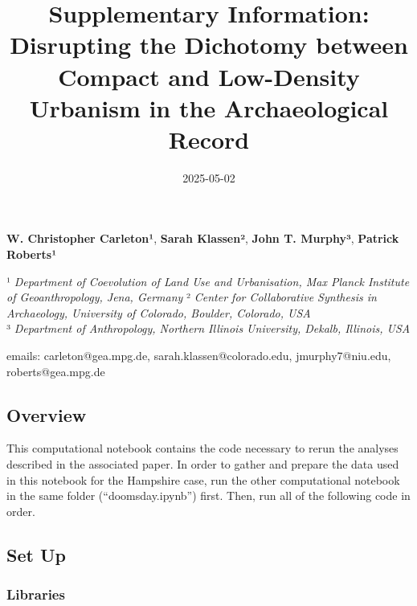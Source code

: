 \documentclass[
  11pt,
  letterpaper,
  DIV=11,
  numbers=noendperiod]{scrartcl}
\title{Supplementary Information: Disrupting the Dichotomy between
Compact and Low-Density Urbanism in the Archaeological Record}
\author{}
\date{2025-05-02}
\begin{document}
\maketitle

\textbf{W. Christopher Carleton¹}, \textbf{Sarah Klassen²}, \textbf{John
T. Murphy³}, \textbf{Patrick Roberts¹}

¹ \emph{Department of Coevolution of Land Use and Urbanisation, Max
Planck Institute of Geoanthropology, Jena, Germany} ² \emph{Center for
Collaborative Synthesis in Archaeology, University of Colorado, Boulder,
Colorado, USA}\\
³ \emph{Department of Anthropology, Northern Illinois University,
Dekalb, Illinois, USA}

emails: carleton@gea.mpg.de, sarah.klassen@colorado.edu,
jmurphy7@niu.edu, roberts@gea.mpg.de

\subsection{Overview}\label{overview}

This computational notebook contains the code necessary to rerun the
analyses described in the associated paper. In order to gather and
prepare the data used in this notebook for the Hampshire case, run the
other computational notebook in the same folder (``doomsday.ipynb'')
first. Then, run all of the following code in order.

\subsection{Set Up}\label{set-up}

\subsubsection{Libraries}\label{libraries}
\end{document}

